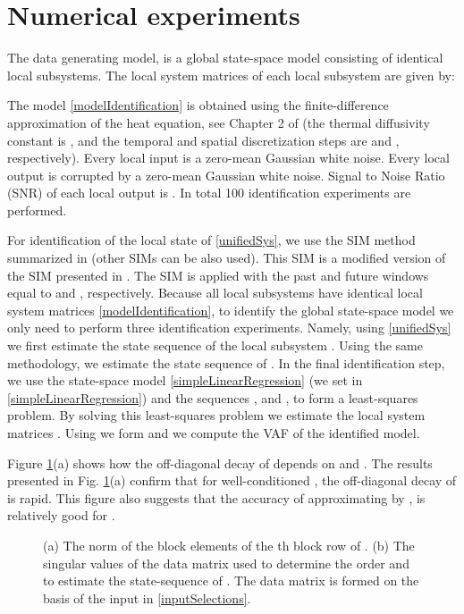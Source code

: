 \documentclass[journal,10pt]{IEEEtran}
\begin{document}
\section{Numerical experiments}
\label{numericalSection}
The data generating model, is a global state-space model consisting of  identical local subsystems. The local system matrices of each local subsystem are given by:
\begin{small}

\end{small}
The model \eqref{modelIdentification} is obtained using the finite-difference approximation of the heat equation, see Chapter 2 of \cite{haberThesis} (the thermal diffusivity constant is , and the temporal and spatial discretization steps are  and , respectively). Every local input is a zero-mean Gaussian white noise. Every local output is corrupted by a zero-mean Gaussian white noise. Signal to Noise Ratio (SNR) of each local output is  . In total 100 identification experiments are performed.
\par
For identification of the local state of \eqref{unifiedSys}, we use the SIM method summarized in \cite{haber2} (other SIMs can be also used). This SIM is a modified version of the SIM presented in \cite{jansson2003}. The SIM is applied with the past and future windows equal to  and , respectively.  Because all local subsystems have identical local system matrices \eqref{modelIdentification}, to identify the global state-space model we only need to perform three identification experiments. Namely, using \eqref{unifiedSys} we first estimate the state sequence of the local subsystem . Using the same methodology, we estimate the state sequence of . In the final identification step, we use the state-space model \eqref{simpleLinearRegression} (we set  in \eqref{simpleLinearRegression}) and the sequences , and , to form a least-squares problem. By solving this least-squares problem we estimate the local system matrices . Using  we form   and we compute the VAF of the identified model. 
\par
Figure \ref{decayFinv}(a) shows how the off-diagonal decay of  depends on  and . The results presented in Fig. \ref{decayFinv}(a) confirm that for well-conditioned , the off-diagonal decay of  is rapid. This figure also suggests that the accuracy of approximating  by , is relatively good for .
\begin{figure}[H]
\centering
 \;\;
 \caption{\small{(a) The norm of the block elements  of the th block row of . (b) The singular values of the data matrix used to determine the order and to estimate the state-sequence of . The data matrix is formed on the basis of the input  in \eqref{inputSelections}.}}
\label{decayFinv}
\end{figure}
\end{document}
